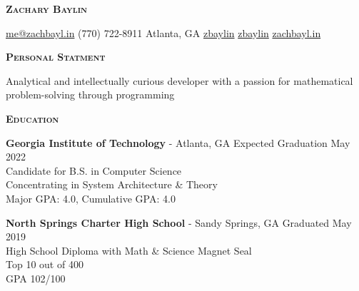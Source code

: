 \documentclass{article}
\newcommand{\sectionHeader}[1]{{\large \textbf{\textsc{#1}}}\hspace{5pt}\xrfill[.5ex]{.4pt}}
\begin{document}
  \begin{center}
    {\Large \textbf{\textsc{Zachary Baylin}}}

    \vspace{3pt}

    \href{mailto:me@zachbayl.in}{\faEnvelope \hspace{1pt} me@zachbayl.in} \hspace{3pt} \faPhone \hspace{1pt} (770) 722-8911 \hspace{3pt}  Atlanta, GA \hspace{3pt} \href{https://linkedin.com/in/zbaylin}{\faLinkedin \hspace{1pt} zbaylin} \hspace{3pt} \href{https://github.com/zbaylin}{\faGithub \hspace{1pt} zbaylin} \hspace{3pt} \href{http://zachbayl.in}{\faGlobeAmericas \hspace{1pt} zachbayl.in}\\
  \end{center}

  \sectionHeader{Personal Statment}

  \vspace{3pt}

  Analytical and intellectually curious developer with a passion for mathematical problem-solving through programming

  \vspace{8pt}

  \sectionHeader{Education}

  \vspace{3pt}

  \textbf{Georgia Institute of Technology} - Atlanta, GA \hspace*{\fill}Expected Graduation May 2022\\
  Candidate for B.S. in Computer Science\\
  Concentrating in System Architecture \& Theory\\
  Major GPA: 4.0, Cumulative GPA: 4.0

  \vspace{5pt}

  \textbf{North Springs Charter High School} - Sandy Springs, GA \hspace*{\fill}Graduated May 2019\\
  High School Diploma with Math \& Science Magnet Seal\\
  Top 10 out of 400\\
  GPA 102/100
\end{document}
